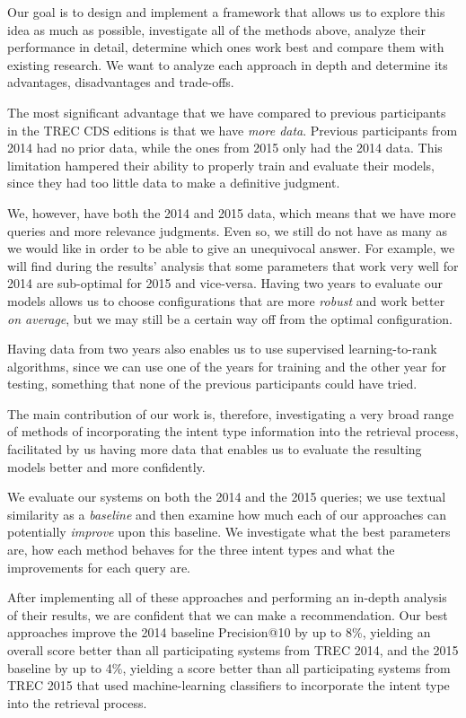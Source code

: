 Our goal is to design and implement a framework that allows us
to explore this idea as much as possible, investigate all of the methods above,
analyze their performance in detail,
determine which ones work best and compare them with existing research.
We want to analyze each approach in depth and determine its advantages, disadvantages and trade-offs.

The most significant advantage that we have compared to previous participants in the TREC CDS editions is
that we have \emph{more data}. Previous participants from 2014 had no prior data, while the ones from 2015
only had the 2014 data. This limitation hampered their ability to properly train and evaluate their models, since they
had too little data to make a definitive judgment.

We, however, have both the 2014 and 2015 data, which means that
we have more queries and more relevance judgments.
Even so, we still do not have as many as we would like in order to be able to give an unequivocal answer.
For example, we will find during the results' analysis
that some parameters that work very well for 2014 are sub-optimal for 2015 and vice-versa.
Having two
years to evaluate our models allows us to choose configurations that are more \emph{robust} and work better \emph{on average}, but we
may still be a certain way off from the optimal configuration.

Having data from two years also
enables us to use supervised learning-to-rank algorithms,
since we can use one of the years for training and the other year for testing,
something that none of the previous participants could have tried.

The main contribution of our work is, therefore, investigating a very broad range of methods of incorporating
the intent type information into the retrieval process,
facilitated by us having more data that enables us to evaluate the resulting models better and more confidently.

We evaluate our systems on both the 2014 and the 2015 queries; we use textual similarity
as a \emph{baseline} and then examine how much each of our approaches can potentially \emph{improve} upon this baseline.
We investigate what the best parameters are, how each method behaves for the three
intent types and what the improvements for each query are.

After implementing all of these approaches and performing an in-depth analysis of their results,
we are confident that we can make a recommendation.
Our best approaches improve the 2014 baseline Precision@10 by up to 8\%, yielding an overall
score better than all participating systems from TREC 2014,
and the 2015 baseline by up to 4\%, yielding a score better than all participating
systems from TREC 2015 that used machine-learning classifiers to incorporate the intent
type into the retrieval process.

